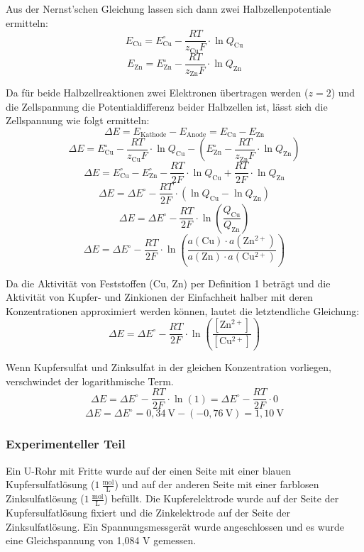\documentclass[
	a4paper,										%
	12pt,											%
	twoside,										%
	headsepline,								%
	footsepline,									%
	captions=tableheading,					%
]{scrartcl}
\newcommand{\formel}[2]{				%
	\begin{equation}
		\label{eq: #1}							%
		#2											%
	\end{equation}}
\begin{document}
	Aus der Nernst'schen Gleichung  lassen sich dann zwei Halbzellenpotentiale ermitteln:
	\formel{Cu1}{E_{\mathrm{Cu}} = E^{\circ}_{\mathrm{Cu}} - \frac{RT}{z_{\mathrm{Cu}}F} \cdot \ln Q_{\mathrm{Cu}}}
	\formel{Zn1}{E_{\mathrm{Zn}} = E^{\circ}_{\mathrm{Zn}} - \frac{RT}{z_{\mathrm{Zn}}F} \cdot \ln Q_{\mathrm{Zn}}}

	Da für beide Halbzellreaktionen zwei Elektronen übertragen werden ($z=2$) und die Zellspannung die Potentialdifferenz beider Halbzellen ist, lässt sich die Zellspannung wie folgt ermitteln:
	\formel{E3}{\Delta E = E_{\mathrm{Kathode}} - E_{\mathrm{Anode}} = E_{\mathrm{Cu}} - E_{\mathrm{Zn}}}
	\formel{E4}{\Delta E = E^{\circ}_{\mathrm{Cu}} - \frac{RT}{z_{\mathrm{Cu}}F} \cdot \ln Q_{\mathrm{Cu}} - (E^{\circ}_{\mathrm{Zn}} - \frac{RT}{z_{\mathrm{Zn}}F} \cdot \ln Q_{\mathrm{Zn}})}
	\formel{E5}{\Delta E = E^{\circ}_{\mathrm{Cu}} - E^{\circ}_{\mathrm{Zn}} - \frac{RT}{2F} \cdot \ln Q_{\mathrm{Cu}} + \frac{RT}{2F} \cdot \ln Q_{\mathrm{Zn}}}
	\formel{E6}{\Delta E = \Delta E^{\circ} - \frac{RT}{2F} \cdot (\ln Q_{\mathrm{Cu}} - \ln Q_{\mathrm{Zn}})}
	\formel{E7}{\Delta E = \Delta E^{\circ} - \frac{RT}{2F} \cdot \ln (\frac{Q_{\mathrm{Cu}}}{Q_{\mathrm{Zn}}})}
	\formel{E8}{\Delta E = \Delta E^{\circ} - \frac{RT}{2F} \cdot \ln (\frac{a(\mathrm{Cu}) \cdot a(\mathrm{Zn^{2+}})}{a(\mathrm{Zn}) \cdot a(\mathrm{Cu^{2+}})})}%

	Da die Aktivität von Feststoffen (Cu, Zn) per Definition 1 beträgt und die Aktivität von Kupfer- und Zinkionen der Einfachheit halber mit deren Konzentrationen approximiert werden können,
	lautet die letztendliche Gleichung:
	\formel{E9}{\Delta E = \Delta E^{\circ} - \frac{RT}{2F} \cdot \ln (\frac{[\mathrm{Zn^{2+}}]}{[\mathrm{Cu^{2+}}]})}

	Wenn Kupfersulfat und Zinksulfat in der gleichen Konzentration vorliegen, verschwindet der logarithmische Term.
	\formel{E10}{\Delta E = \Delta E^{\circ} - \frac{RT}{2F} \cdot \ln (1) = \Delta E^{\circ} - \frac{RT}{2F} \cdot 0}
	\formel{E11}{\Delta E = \Delta E^{\circ} = 0,34\ \mathrm{V} - (-0,76\ \mathrm{V}) = 1,10\ \mathrm{V}}

\subsubsection{Experimenteller Teil}

	Ein U-Rohr mit Fritte wurde auf der einen Seite mit einer blauen Kupfersulfatlösung ($1\ \mathrm{\frac{mol}{L}}$) und auf der anderen Seite mit einer farblosen Zinksulfatlösung ($1\ \mathrm{\frac{mol}{L}}$) befüllt.
	Die Kupferelektrode wurde auf der Seite der Kupfersulfatlösung fixiert und die Zinkelektrode auf der Seite der Zinksulfatlösung.
	Ein Spannungsmessgerät wurde angeschlossen und es wurde eine Gleichspannung von 1,084 V gemessen.
\end{document}
